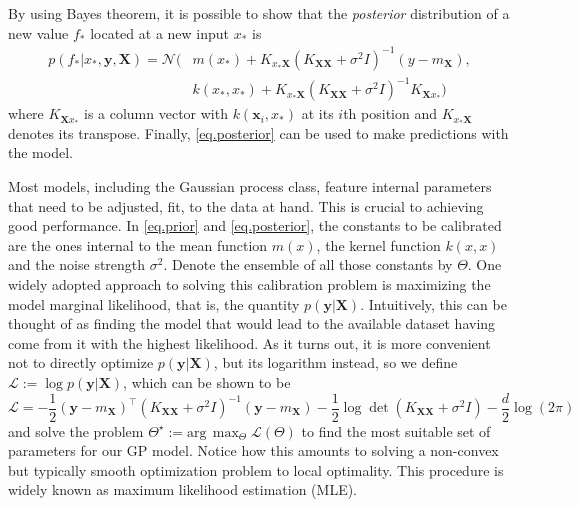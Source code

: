 By using Bayes theorem, it is possible to show that the \textit{posterior} distribution of a new value $f_*$ located at a new input $x_*$ is  \citep[§2.2]{williams2006gaussian}
\begin{equation}
\label{eq.posterior}
\begin{aligned}
	p(f_* | x_*, \mathbf{y}, \mathbf{X}) = \mathcal{N}( &m(x_*) + K_{x_*\mathbf{X}} (K_{\mathbf{X}\mathbf{X}} + \sigma^2 I)^{-1} (y-m_\mathbf{X}),	\\
	&k(x_*,x_*) + K_{x_*\mathbf{X}} (K_{\mathbf{X}\mathbf{X}} + \sigma^2 I)^{-1} K_{\mathbf{X}x_*})
\end{aligned}
\end{equation}
where $K_{\mathbf{X}x_*}$ is a column vector with $k(\mathbf{x}_i,x_*)$ at its $i$th position and $K_{x_*\mathbf{X}}$ denotes its transpose. Finally, \eqref{eq.posterior} can be used to make predictions with the model.

Most models, including the Gaussian process class, feature internal parameters that need to be adjusted, fit, to the data at hand. This is crucial to achieving good performance. In \eqref{eq.prior} and \eqref{eq.posterior}, the constants to be calibrated are the ones internal to the mean function $m(x)$, the kernel function $k(x,x)$ and the noise strength $\sigma^2$. Denote the ensemble of all those constants by $\Theta$. One widely adopted approach to solving this calibration problem is maximizing the model marginal likelihood, that is, the quantity $p(\mathbf{y} | \mathbf{X})$. Intuitively, this can be thought of as finding the model that would lead to the available dataset having come from it with the highest likelihood. As it turns out, it is more convenient not to directly optimize $p(\mathbf{y} | \mathbf{X})$, but its logarithm instead, so we define $\mathcal{L} := \log p(\mathbf{y} | \mathbf{X})$, which can be shown to be \citep[§2.3]{williams2006gaussian}
\begin{equation}
	\label{eq.max_likelihood_obj}
	\mathcal{L} = -\frac{1}{2} (\mathbf{y}-m_\mathbf{X})^\top (K_{\mathbf{X}\mathbf{X}} + \sigma^2 I)^{-1} (\mathbf{y}-m_\mathbf{X}) -\frac{1}{2} \log \det (K_{\mathbf{X}\mathbf{X}} + \sigma^2 I) -\frac{d}{2} \log (2 \pi)
\end{equation}
and solve the problem $\Theta^\star := \text{arg} \,\max_\Theta \mathcal{L}(\Theta)$ to find the most suitable set of parameters for our GP model. Notice how this amounts to solving a non-convex but typically smooth optimization problem to local optimality. This procedure is widely known as maximum likelihood estimation (MLE).

